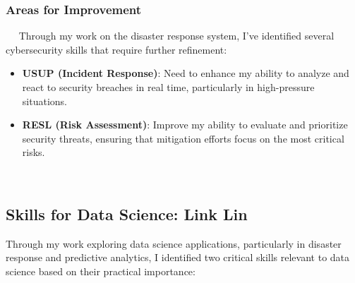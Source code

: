 \documentclass[a4paper, 11pt]{report}
\begin{document}
\subsubsection{Areas for Improvement}  
Through my work on the disaster response system, I've identified several cybersecurity skills that require further refinement:
\begin{itemize}
    \item \textbf{USUP (Incident Response)}: Need to enhance my ability to analyze and react to security breaches in real time, particularly in high-pressure situations.
    \item \textbf{RESL (Risk Assessment)}: Improve my ability to evaluate and prioritize security threats, ensuring that mitigation efforts focus on the most critical risks.
\end{itemize}   

\subsection*{Skills for Data Science: Link Lin}

Through my work exploring data science applications, particularly in disaster response and predictive analytics, I identified two critical skills relevant to data science based on their practical importance:
\end{document}
